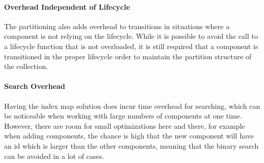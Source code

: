 \paragraph{Overhead Independent of Lifecycle}
The partitioning also adds overhead to transitions in situations where a component is not relying on the lifecycle.
While it is possible to avoid the call to a lifecycle function that is not overloaded, it is still required
that a component is transitioned in the proper lifecycle order to maintain the partition structure of the collection.

\paragraph{Search Overhead}
Having the index map solution does incur time overhead for searching, which can be noticeable when working with
large numbers of components at one time. However, there are room for small optimizations here and there,
for example when adding components, the chance is high that the new component will have an id which is larger
than the other components, meaning that the binary search can be avoided in a lot of cases.
